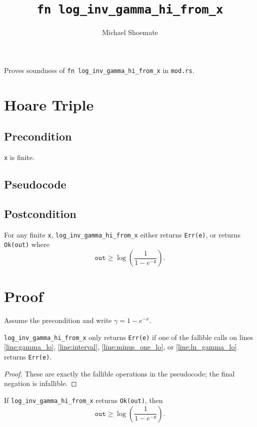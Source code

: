 \documentclass{article}
\title{\texttt{fn log\_inv\_gamma\_hi\_from\_x}}
\author{Michael Shoemate}
\begin{document}
\maketitle

Proves soundness of \texttt{fn log\_inv\_gamma\_hi\_from\_x} in \texttt{mod.rs}.

\section{Hoare Triple}
\subsection*{Precondition}
\texttt{x} is finite.

\subsection*{Pseudocode}


\subsection*{Postcondition}
\begin{theorem}
\label{postcondition}
For any finite \texttt{x}, \texttt{log\_inv\_gamma\_hi\_from\_x} either returns \texttt{Err(e)},
or returns \texttt{Ok(out)} where
\[
\texttt{out} \ge \log\!\left(\frac{1}{1 - e^{-\texttt{x}}}\right).
\]
\end{theorem}

\section{Proof}
Assume the precondition and write $\gamma = 1 - e^{-x}$.

\begin{lemma}
\label{err-e}
\texttt{log\_inv\_gamma\_hi\_from\_x} only returns \texttt{Err(e)} if one of the fallible calls
on lines \ref{line:gamma_lo}, \ref{line:interval}, \ref{line:minus_one_lo}, or
\ref{line:ln_gamma_lo} returns \texttt{Err(e)}.
\end{lemma}

\begin{proof}
These are exactly the fallible operations in the pseudocode; the final negation is infallible.
\end{proof}

\begin{lemma}
\label{ok-out}
If \texttt{log\_inv\_gamma\_hi\_from\_x} returns \texttt{Ok(out)}, then
\[
\texttt{out} \ge \log\!\left(\frac{1}{1 - e^{-\texttt{x}}}\right).
\]
\end{lemma}
\end{document}
